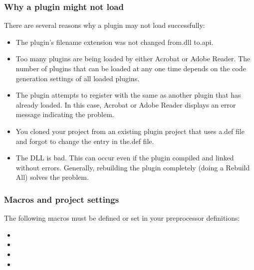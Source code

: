 \documentclass[letterpaper,12pt,english,openany,oneside]{sphinxmanual}
\begin{document}
\subsubsection{Why a plugin might not load}
\label{\detokenize{Plugins_CreatingSimplePlug:why-a-plugin-might-not-load}}
There are several reasons why a plugin may not load successfully:
\begin{itemize}
\item {} 
The plugin’s filename extension was not changed from.dll to.api.

\item {} 
Too many plugins are being loaded by either Acrobat or Adobe Reader. The number of plugins that can be loaded at any one time depends on the code generation settings of all loaded plugins.

\item {} 
The plugin attempts to register with the same  as another plugin that has already loaded. In this case, Acrobat or Adobe Reader displays an error message indicating the problem.

\item {} 
You cloned your project from an existing plugin project that uses a.def file and forgot to change the  entry in the.def file.

\item {} 
The DLL is bad. This can occur even if the plugin compiled and linked without errors. Generally, rebuilding the plugin completely (doing a Rebuild All) solves the problem.

\end{itemize}


\subsubsection{Macros and project settings}
\label{\detokenize{Plugins_CreatingSimplePlug:macros-and-project-settings}}
The following macros must be defined or set in your preprocessor definitions:
\begin{itemize}
\item {} 

\item {} 

\item {} 

\item {} 

\end{itemize}
\end{document}
